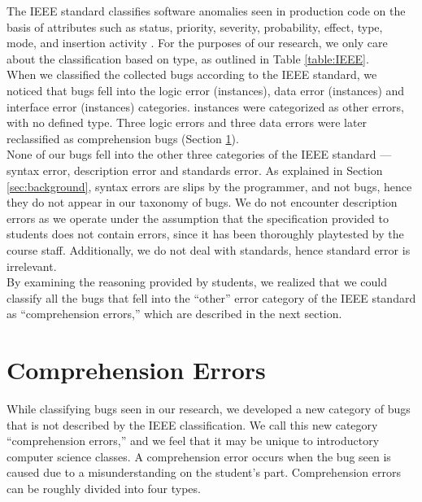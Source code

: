 \documentclass{sig-alternate}
\begin{document}
The IEEE standard classifies software anomalies seen in production code on the basis of attributes such as status, priority, severity, probability, effect, type, mode, and insertion activity \cite{IEEE10}. For the purposes of our research, we only care about the classification based on type, as outlined in Table \ref{table:IEEE}.\\


When we classified the collected bugs according to the IEEE standard, we noticed that bugs fell into the logic error (\numlogicIEEE instances), data error (\numdataIEEE instances) and interface error (\numinterfaceIEEE instances) categories. \numotherIEEE instances were categorized as other errors, with no defined type. Three logic errors and three data errors were later reclassified as comprehension bugs (Section \ref{sec:comprehension}).\\

None of our bugs fell into the other three categories of the IEEE standard --- syntax error, description error and standards error. As explained in Section \ref{sec:background}, syntax errors are slips by the programmer, and not bugs, hence they do not appear in our taxonomy of bugs. We do not encounter description errors as we operate under the assumption that the specification provided to students does not contain errors, since it has been thoroughly playtested by the course staff. Additionally, we do not deal with standards, hence standard error is irrelevant.\\

By examining the reasoning provided by students, we realized that we could classify all the bugs that fell into the ``other'' error category of the IEEE standard as ``comprehension errors,'' which are described in the next section.

\section{Comprehension Errors}
\label{sec:comprehension}

While classifying bugs seen in our research, we developed a new category of bugs that is not described by the IEEE classification. We call this new category ``comprehension errors,'' and we feel that it may be unique to introductory computer science classes. A comprehension error occurs when the bug seen is caused due to a misunderstanding on the student's part. Comprehension errors can be roughly divided into four types.
\vspace{0.06in}
\end{document}

